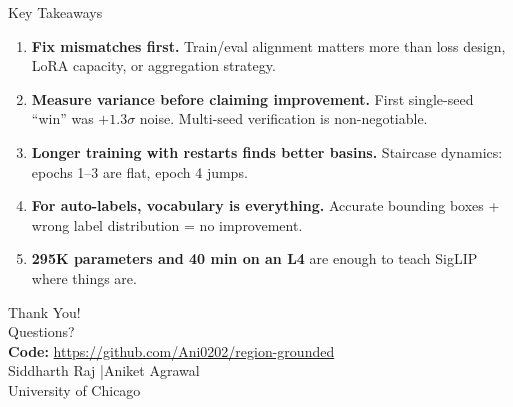 \documentclass[aspectratio=169,12pt]{beamer}
\begin{document}
\begin{frame}{Key Takeaways}
  \begin{enumerate}
    \item \textbf{Fix mismatches first.} Train/eval alignment matters more than loss design, LoRA capacity, or aggregation strategy.

    \vspace{0.5em}
    \item \textbf{Measure variance before claiming improvement.} First single-seed ``win'' was $+1.3\sigma$ noise. Multi-seed verification is non-negotiable.

    \vspace{0.5em}
    \item \textbf{Longer training with restarts finds better basins.} Staircase dynamics: epochs 1--3 are flat, epoch 4 jumps.

    \vspace{0.5em}
    \item \textbf{For auto-labels, vocabulary is everything.} Accurate bounding boxes + wrong label distribution = no improvement.

    \vspace{0.5em}
    \item \textbf{295K parameters and 40 min on an L4} are enough to teach SigLIP where things are.
  \end{enumerate}
\end{frame}

\begin{frame}[standout]
  \Large Thank You!\\[0.5em]
  \normalsize Questions?\\[1.5em]
  {\small
    \textbf{Code:} \url{https://github.com/Ani0202/region-grounded}\\[0.3em]
    Siddharth Raj \quad|\quad Aniket Agrawal\\
    University of Chicago
  }
\end{frame}
\end{document}
